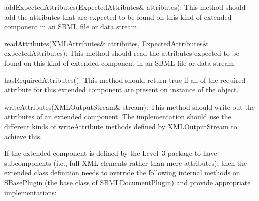 \begin{DoxyItemize}
\item {\ttfamily add\+Expected\+Attributes(\+Expected\+Attributes\& attributes)}\+: This method should add the attributes that are expected to be found on this kind of extended component in an S\+B\+ML file or data stream.\end{DoxyItemize}
\begin{DoxyItemize}
\item {\ttfamily read\+Attributes(\hyperlink{class_x_m_l_attributes}{X\+M\+L\+Attributes}\& attributes, Expected\+Attributes\& expected\+Attributes)}\+: This method should read the attributes expected to be found on this kind of extended component in an S\+B\+ML file or data stream.\end{DoxyItemize}
\begin{DoxyItemize}
\item {\ttfamily has\+Required\+Attributes()}\+: This method should return {\ttfamily true} if all of the required attribute for this extended component are present on instance of the object.\end{DoxyItemize}
\begin{DoxyItemize}
\item {\ttfamily write\+Attributes(\+X\+M\+L\+Output\+Stream\& stream)}\+: This method should write out the attributes of an extended component. The implementation should use the different kinds of {\ttfamily write\+Attribute} methods defined by \hyperlink{class_x_m_l_output_stream}{X\+M\+L\+Output\+Stream} to achieve this.\end{DoxyItemize}


If the extended component is defined by the Level~3 package to have subcomponents (i.\+e., full X\+ML elements rather than mere attributes), then the extended class definition needs to override the following internal methods on \hyperlink{class_s_base_plugin}{S\+Base\+Plugin} (the base class of \hyperlink{class_s_b_m_l_document_plugin}{S\+B\+M\+L\+Document\+Plugin}) and provide appropriate implementations\+:

